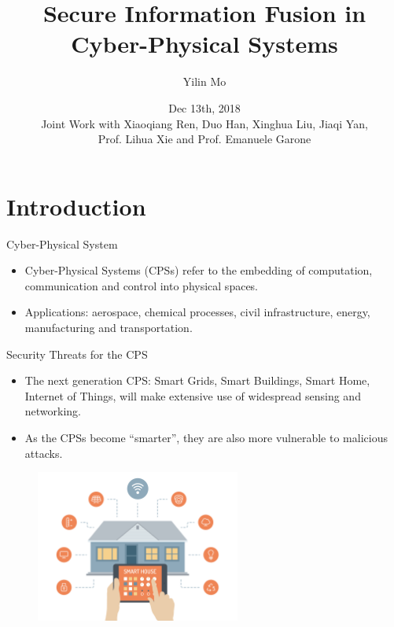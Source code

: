 \documentclass[10pt]{beamer}
\title[Secure Info Fusion]{Secure Information Fusion in Cyber-Physical Systems}
\author[Yilin Mo]{Yilin Mo}
\institute[Tsinghua]{
  Department of Automation\\ Tsinghua University\\
}
\date[Dec 13, 2018]{Dec 13th, 2018 \\ 
  \small Joint Work with Xiaoqiang Ren, Duo Han, Xinghua Liu, Jiaqi Yan,\\
  Prof. Lihua Xie and Prof. Emanuele Garone}
\begin{document}
\maketitle 

\section{Introduction}

\begin{frame}{Cyber-Physical System}
  \begin{itemize}
  \item Cyber-Physical Systems (CPSs) refer to the embedding of computation, communication and control into physical spaces.
    \begin{center}
    \end{center}
  \item Applications: aerospace, chemical processes, civil infrastructure, energy, manufacturing and transportation. 
  \end{itemize}
\end{frame}

\begin{frame}{Security Threats for the CPS}
  \begin{itemize}
  \item The next generation CPS: Smart Grids, Smart Buildings, Smart Home, Internet of Things, will make extensive use of widespread sensing and networking.
  \item As the CPSs become ``smarter'', they are also more vulnerable to malicious attacks.
  \end{itemize}
  \begin{figure}[ht]
    \centering
    \includegraphics[width=0.6\textwidth]{SmartHome.jpg}
  \end{figure}
\end{frame}
\end{document}
